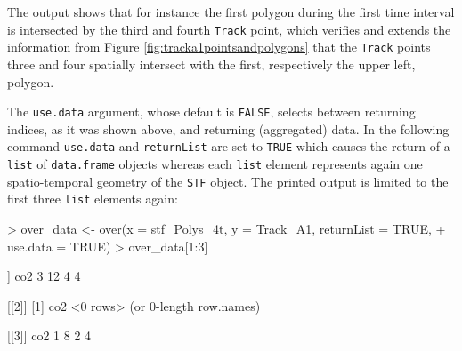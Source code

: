 \documentclass[12pt, oneside, a4paper]{scrbook}
\let\code=\texttt
\begin{document}
The output shows that for instance the first polygon during the first time interval is intersected by the third and fourth \code{Track} point, which verifies and extends the information from Figure \ref{fig:tracka1pointsandpolygons} that the \code{Track} points three and four spatially intersect with the first, respectively the upper left, polygon.
\par\medskip
The \code{use.data} argument, whose default is \code{FALSE}, selects between returning indices, as it was shown above, and returning (aggregated) data. 
In the following command \code{use.data} and \code{returnList} are set to \code{TRUE} which causes the return of a \code{list} of \code{data.frame} objects whereas each \code{list} element represents again one spatio-temporal geometry of the \code{STF} object. The printed output is limited to the first three \code{list} elements again:

\begin{small}
\begin{Schunk}
\begin{Sinput}
> over_data <- over(x = stf_Polys_4t, y = Track_A1, returnList = TRUE,
+                  use.data = TRUE)
> over_data[1:3]
\end{Sinput}
\begin{Soutput}
[[1]]
  co2
3  12
4   4

[[2]]
[1] co2
<0 rows> (or 0-length row.names)

[[3]]
  co2
1   8
2   4
\end{Soutput}
\end{Schunk}
\end{small}
\end{document}
